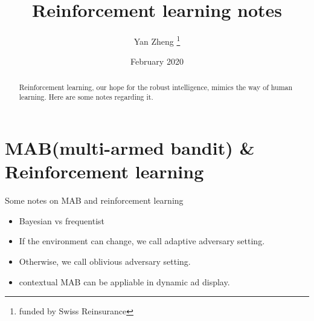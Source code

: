 \documentclass[12pt, letterpaper]{article}
\title{Reinforcement learning notes}
\author{Yan Zheng \thanks{funded by Swiss Reinsurance}}
\date{February 2020}
\begin{document}
\maketitle

\begin{abstract}
Reinforcement learning, our hope for the robust intelligence, mimics the way of human learning. Here are some notes regarding it.
\end{abstract}

\section{MAB(multi-armed bandit) \& Reinforcement learning}
Some notes on MAB and reinforcement learning
\begin{itemize}
  \item Bayesian vs frequentist	
  \item If the environment can change, we call adaptive adversary setting.
  \item Otherwise, we call oblivious adversary setting.
  \item contextual MAB can be appliable in dynamic ad display.
\end{itemize}
\end{document}
